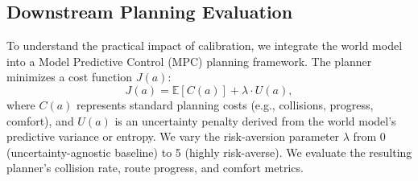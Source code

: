 \subsection{Downstream Planning Evaluation}
To understand the practical impact of calibration, we integrate the world model into a Model Predictive Control (MPC) planning framework. The planner minimizes a cost function $J(a)$:
\begin{equation}
J(a) = \mathbb{E}[C(a)] + \lambda \cdot U(a),
\end{equation}
where $C(a)$ represents standard planning costs (e.g., collisions, progress, comfort), and $U(a)$ is an uncertainty penalty derived from the world model's predictive variance or entropy. We vary the risk-aversion parameter $\lambda$ from 0 (uncertainty-agnostic baseline) to 5 (highly risk-averse). We evaluate the resulting planner's collision rate, route progress, and comfort metrics.
